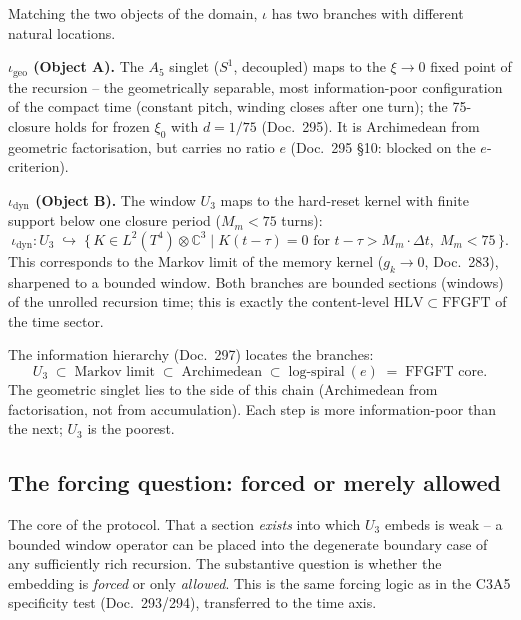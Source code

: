 Matching the two objects of the domain, $\iota$ has two branches with
different natural locations.

\textbf{$\iota_{\text{geo}}$ (Object A).} The $A_5$ singlet ($S^1$,
decoupled) maps to the $\xi\to 0$ fixed point of the recursion -- the
geometrically separable, most information-poor configuration of the compact
time (constant pitch, winding closes after one turn); the 75-closure holds for frozen $\xi_0$ with $d=1/75$
(Doc.~295). It is Archimedean from
geometric factorisation, but carries no ratio $e$ (Doc.~295 §10: blocked on
the $e$-criterion).

\textbf{$\iota_{\text{dyn}}$ (Object B).} The window $U_3$ maps to the
hard-reset kernel with finite support below one closure period
($M_m < 75$ turns):
\begin{equation}
  \iota_{\text{dyn}}\colon U_3 \;\hookrightarrow\;
  \bigl\{\,K \in L^2(T^4)\otimes\mathbb{C}^3 \;\big|\;
  K(t-\tau) = 0 \text{ for } t-\tau > M_m\cdot\Delta t,\;
  M_m < 75\,\bigr\}.
\end{equation}
This corresponds to the Markov limit of the memory kernel ($g_k\to 0$,
Doc.~283), sharpened to a bounded window. Both branches are bounded sections
(windows) of the unrolled recursion time; this is exactly the content-level
$\mathrm{HLV}\subset\mathrm{FFGFT}$ of the time sector.

The information hierarchy (Doc.~297) locates the branches:
\begin{equation}
  U_3 \;\subset\; \text{Markov limit} \;\subset\;
  \text{Archimedean} \;\subset\; \text{log-spiral}~(e)
  \;=\; \text{FFGFT core}.
\end{equation}
The geometric singlet lies to the side of this chain (Archimedean from
factorisation, not from accumulation). Each step is more information-poor
than the next; $U_3$ is the poorest.

\subsection*{The forcing question: forced or merely allowed}

The core of the protocol. That a section \emph{exists} into which $U_3$
embeds is weak -- a bounded window operator can be placed into the degenerate
boundary case of any sufficiently rich recursion. The substantive question is
whether the embedding is \emph{forced} or only \emph{allowed}. This is the
same forcing logic as in the C3A5 specificity test (Doc.~293/294),
transferred to the time axis.

